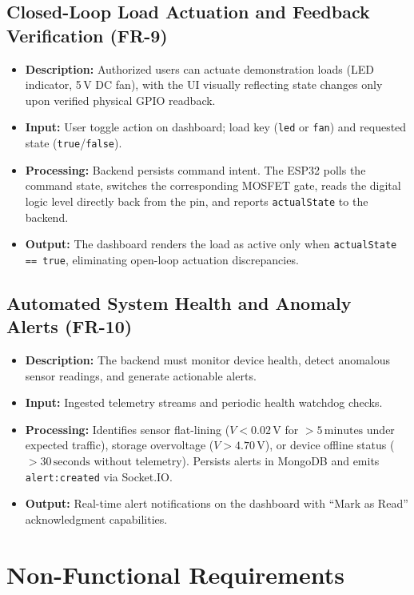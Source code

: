 \subsection{Closed-Loop Load Actuation and Feedback Verification (FR-9)}
\begin{itemize}
    \item \textbf{Description:} Authorized users can actuate demonstration loads (LED indicator, 5\,V DC fan), with the UI visually reflecting state changes only upon verified physical GPIO readback.
    \item \textbf{Input:} User toggle action on dashboard; load key (\texttt{led} or \texttt{fan}) and requested state (\texttt{true}/\texttt{false}).
    \item \textbf{Processing:} Backend persists command intent. The ESP32 polls the command state, switches the corresponding MOSFET gate, reads the digital logic level directly back from the pin, and reports \texttt{actualState} to the backend.
    \item \textbf{Output:} The dashboard renders the load as active only when \texttt{actualState == true}, eliminating open-loop actuation discrepancies.
\end{itemize}

\subsection{Automated System Health and Anomaly Alerts (FR-10)}
\begin{itemize}
    \item \textbf{Description:} The backend must monitor device health, detect anomalous sensor readings, and generate actionable alerts.
    \item \textbf{Input:} Ingested telemetry streams and periodic health watchdog checks.
    \item \textbf{Processing:} Identifies sensor flat-lining ($V < 0.02\,\text{V}$ for $>5\,\text{minutes}$ under expected traffic), storage overvoltage ($V > 4.70\,\text{V}$), or device offline status ($>30\,\text{seconds}$ without telemetry). Persists alerts in MongoDB and emits \texttt{alert:created} via Socket.IO.
    \item \textbf{Output:} Real-time alert notifications on the dashboard with ``Mark as Read'' acknowledgment capabilities.
\end{itemize}

\section{Non-Functional Requirements}

